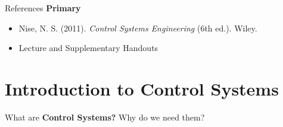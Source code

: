 \documentclass[12pt, aspectratio=169]{beamer}
\begin{document}




% 


\begin{frame}{References}
\textbf{Primary}
\begin{itemize}
    \item Nise, N. S. (2011). \emph{Control Systems Engineering} (6th ed.). Wiley. %
    \item Lecture and Supplementary Handouts
\end{itemize}
\end{frame}


\section{Introduction to Control Systems}


\begin{frame}{}
\centering
    \Large What are \textbf{Control Systems?} \newline \newline Why do we need them?
\end{frame}
\end{document}
